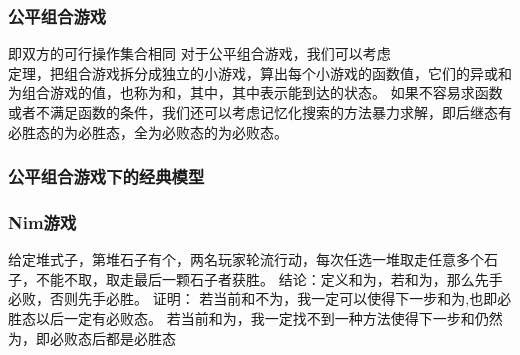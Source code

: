 \documentclass[8pt,a4paper]{article}
\newcommand{\code}[1]{
    
}
\newcommand{\txt}[1]{\par\noindent\footnotesize #1}
\newcommand{\inlineformula}[1]{\ensuremath{}}
\newcommand{\displayformula}[1]{%
    \vspace{0.2em}
    \[
        
    \]
}
\begin{document}
\begin{multicols}{2}
        \subsubsection{公平组合游戏}
            \txt{即双方的可行操作集合相同
对于公平组合游戏，我们可以考虑\displayformula{./assets/formulas_tex/formula_497.tex}定理，把组合游戏拆分成独立的小游戏，算出每个小游戏的\inlineformula{./assets/formulas_tex/formula_498.tex}函数值，它们的异或和为组合游戏的\inlineformula{./assets/formulas_tex/formula_499.tex}值，也称为\inlineformula{./assets/formulas_tex/formula_500.tex}和，其中\inlineformula{./assets/formulas_tex/formula_501.tex}，其中\inlineformula{./assets/formulas_tex/formula_502.tex}表示\inlineformula{./assets/formulas_tex/formula_503.tex}能到达的状态。
如果不容易求\inlineformula{./assets/formulas_tex/formula_504.tex}函数或者不满足\inlineformula{./assets/formulas_tex/formula_505.tex}函数的条件，我们还可以考虑记忆化搜索的方法暴力求解，即后继态有必胜态的为必胜态，全为必败态的为必败态。}
            \code{src/number_theory/随机化算法_9_5.cpp}
        \subsubsection{公平组合游戏下的经典模型}
        \subsubsection{Nim游戏}
            \txt{给定\inlineformula{./assets/formulas_tex/formula_506.tex}堆式子，第\inlineformula{./assets/formulas_tex/formula_507.tex}堆石子有\inlineformula{./assets/formulas_tex/formula_508.tex}个，两名玩家轮流行动，每次任选一堆取走任意多个石子，不能不取，取走最后一颗石子者获胜。
结论：定义\inlineformula{./assets/formulas_tex/formula_509.tex}和为\inlineformula{./assets/formulas_tex/formula_510.tex}，若\inlineformula{./assets/formulas_tex/formula_511.tex}和为\inlineformula{./assets/formulas_tex/formula_512.tex}，那么先手必败，否则先手必胜。
证明：
若当前\inlineformula{./assets/formulas_tex/formula_513.tex}和不为\inlineformula{./assets/formulas_tex/formula_514.tex}，我一定可以使得下一步\inlineformula{./assets/formulas_tex/formula_515.tex}和为\inlineformula{./assets/formulas_tex/formula_516.tex},也即必胜态以后一定有必败态。
若当前\inlineformula{./assets/formulas_tex/formula_517.tex}和为\inlineformula{./assets/formulas_tex/formula_518.tex}，我一定找不到一种方法使得下一步\inlineformula{./assets/formulas_tex/formula_519.tex}和仍然为\inlineformula{./assets/formulas_tex/formula_520.tex}，即必败态后都是必胜态}

\end{multicols}
\end{document}
